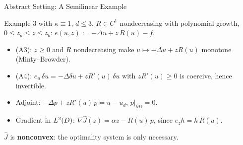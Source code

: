 \documentclass[main.tex]{subfiles}
\begin{document}
\begin{frame}{Abstract Setting: A Semilinear Example}
  \begin{hlbox}
    Example 3 with $\kappa \equiv 1$, $d \le 3$, $R \in C^1$ nondecreasing with polynomial growth, $0 \le z_a \le z \le z_b$:
    \(
      e(u,z) := -\Delta u + z\,R(u) - f .
    \)
  \end{hlbox}

  \begin{hlbox}
    \begin{itemize}
      \item (A3): $z \ge 0$ and $R$ nondecreasing make $u \mapsto -\Delta u + zR(u)$ monotone (Minty--Browder).
      \item (A4): $e_u\,\delta u = -\Delta\delta u + zR'(u)\,\delta u$ with $zR'(u) \ge 0$ is coercive, hence invertible.
      \item Adjoint: \; $-\Delta p + zR'(u)\,p = u - u_d$, \; $p|_{\partial D} = 0$.
      \item Gradient in $L^2(D)$: \; $\nabla \hat J(z) = \alpha z - R(u)\,p$, since $e_z h = h\,R(u)$.
    \end{itemize}
  \end{hlbox}

  \begin{qbox}
    $\hat J$ is \textbf{nonconvex}: the optimality system is only necessary.
  \end{qbox}
  \vfill\hfill\hyperlink{general<3>}{}
\end{frame}
\end{document}
